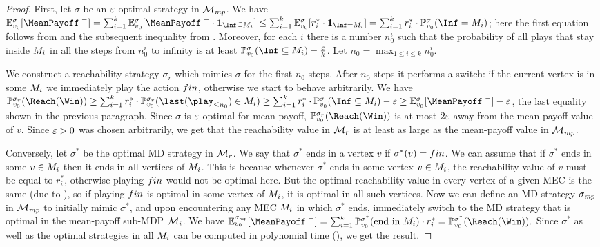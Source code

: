 \begin{proof}
First, let $\sigma$ be an $\varepsilon$-optimal strategy in $\mathcal{M}_{\mathit{mp}}$. 
We have $\expv^\sigma_{\vinit}[\MeanPayoffInf] = \sum_{i=1}^k\expv^\sigma_{\vinit}[\MeanPayoffInf\cdot \indicator{\Inf\subseteq\mec_i}] \leq \sum_{i=1}^k \expv^\sigma_{\vinit}[r_i^*\cdot \indicator{\Inf=\mec_i}] = \sum_{i=1}^k r_i^* \cdot \probm_{\vinit}^\sigma(\Inf=\mec_i) $; here the first equation follows from  and the subsequent inequality from . Moreover, for each $i$ there is a number $n_0^i$ such that the probability of all plays that stay inside $M_i$ in all the steps from $n_0^i$ to infinity is at least $\probm_{\vinit}^\sigma(\Inf\subseteq\mec_i) - \frac{\eps}{k} $. Let $n_0 = \max_{1\leq i \leq k} n^i_0$.

We construct a reachability strategy $\sigma_r$ which mimics $\sigma$ for the first $n_0$ steps. After $n_0$ steps it performs a switch: if the current vertex is in some $M_i$ we immediately play the action $fin$, otherwise we start to behave arbitrarily. We have $\probm_{\vinit}^{\sigma_r}(\Reach(\Win)) \geq \sum_{i=1}^{k} r_i^* \cdot \probm_{\vinit}^{\sigma_r}(\last(\play_{\leq n_0}) \in \mec_i ) \geq \sum_{i=1}^k r_i^* \cdot \probm_{\vinit}^\sigma(\Inf\subseteq\mec_i) - \eps \geq \expv^\sigma_{\vinit}[\MeanPayoffInf] -\eps$, the last equality shown in the previous paragraph. Since $\sigma$ is $\varepsilon$-optimal for mean-payoff, $\probm_{\vinit}^{\sigma_r}(\Reach(\Win))$ is at most $2\varepsilon$ away from the mean-payoff value of $ v $. Since $\varepsilon>0$ was chosen arbitrarily, we get that the reachability value in $\mathcal{M}_{r}$ is at least as large as the mean-payoff value in $\mathcal{M}_{\mathit{mp}}$.

Conversely, let $\sigma^*$ be the optimal MD strategy in $\mathcal{M}_r$. We say that $\sigma^*$ ends in a vertex $v$ if $\sigma^*(v)=fin$. We can assume that if $\sigma^*$ ends in some $v \in M_i$ then it ends in all vertices of $M_i$. This is because whenever $\sigma^*$ ends in some vertex $v \in M_i$, the reachability value of $v$ must be equal to $r^*_i$, otherwise playing $fin$ would not be optimal here. But the optimal reachability value in every vertex of a given MEC is the same (due to ), so if playing $fin$ is optimal in some vertex of $M_i$, it is optimal in all such vertices. Now we can define an MD strategy $\sigma_{\mathit{mp}}$ in $\mathcal{M}_{\mathit{mp}}$ to initially mimic $\sigma^*$, and upon encountering any MEC $M_i$ in which $\sigma^*$ ends, immediately switch to the MD strategy that is optimal in the mean-payoff sub-MDP $\mathcal{M}_i$. We have $\expv^{\sigma_{\smallmp}}_{\vinit}[\MeanPayoffInf]  =  \sum_{i=1}^{k} \probm^{\sigma^*}_{\vinit}(\text{end in }\mec_i)\cdot r^*_i = \probm^{\sigma^*}_{\vinit} (\Reach(\Win)). $ Since $\sigma^*$ as well as the optimal strategies in all $M_i$ can be computed in polynomial time (), we get the result.
%
\end{proof}


